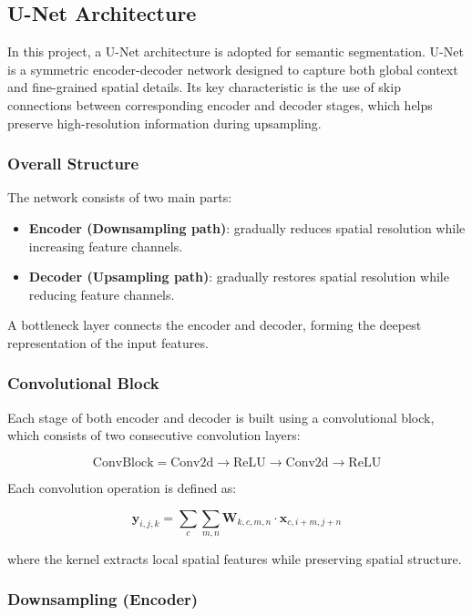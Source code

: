 \subsection{U-Net Architecture}

In this project, a U-Net architecture is adopted for semantic segmentation. U-Net is a symmetric encoder-decoder network designed to capture both global context and fine-grained spatial details. Its key characteristic is the use of skip connections between corresponding encoder and decoder stages, which helps preserve high-resolution information during upsampling.

\subsubsection{Overall Structure}

The network consists of two main parts:
\begin{itemize}
    \item \textbf{Encoder (Downsampling path)}: gradually reduces spatial resolution while increasing feature channels.
    \item \textbf{Decoder (Upsampling path)}: gradually restores spatial resolution while reducing feature channels.
\end{itemize}

A bottleneck layer connects the encoder and decoder, forming the deepest representation of the input features.

\subsubsection{Convolutional Block}

Each stage of both encoder and decoder is built using a convolutional block, which consists of two consecutive convolution layers:

\[
\text{ConvBlock} = \text{Conv2d} \rightarrow \text{ReLU} \rightarrow \text{Conv2d} \rightarrow \text{ReLU}
\]

Each convolution operation is defined as:

\[
\mathbf{y}_{i,j,k} = \sum_{c} \sum_{m,n} \mathbf{W}_{k,c,m,n} \cdot \mathbf{x}_{c,i+m,j+n}
\]

where the kernel extracts local spatial features while preserving spatial structure.

\subsubsection{Downsampling (Encoder)}

